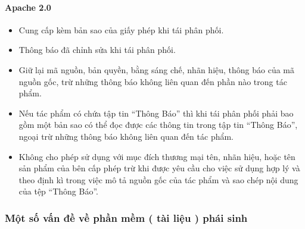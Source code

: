 \documentclass[12pt]{article}
\begin{document}
\paragraph{Apache 2.0}
\begin{itemize}
\item Cung cấp kèm bản sao của giấy phép khi tái phân phối.
\item Thông báo đã chỉnh sửa khi tái phân phối.
\item Giữ lại mã nguồn, bản quyền, bằng sáng chế, nhãn hiệu, thông báo của mã nguồn gốc, trừ những thông báo không liên quan đến phần nào trong tác phẩm.
\item Nếu tác phẩm có chứa tập tin “Thông Báo” thì khi tái phân phối phải bao gồm một bản sao có thể đọc được các thông tin trong tập tin “Thông Báo”, ngoại trừ những thông báo không liên quan đến tác phẩm.
\item Không cho phép sử dụng với mục đích thương mại tên, nhãn hiệu, hoặc tên sản phẩm của bên cấp phép trừ khi được yêu cầu cho việc sử dụng hợp lý và theo định kì trong việc mô tả nguồn gốc của tác phẩm và sao chép nội dung của tệp “Thông Báo”. 
\end{itemize}

\subsubsection{Một số vấn đề về phần mềm ( tài liệu ) phái sinh}
\end{document}
